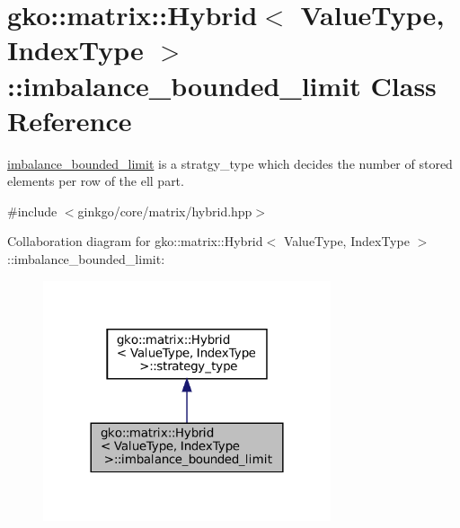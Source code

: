 \hypertarget{classgko_1_1matrix_1_1Hybrid_1_1imbalance__bounded__limit}{}\section{gko\+:\+:matrix\+:\+:Hybrid$<$ Value\+Type, Index\+Type $>$\+:\+:imbalance\+\_\+bounded\+\_\+limit Class Reference}
\label{classgko_1_1matrix_1_1Hybrid_1_1imbalance__bounded__limit}


\hyperlink{classgko_1_1matrix_1_1Hybrid_1_1imbalance__bounded__limit}{imbalance\+\_\+bounded\+\_\+limit} is a stratgy\+\_\+type which decides the number of stored elements per row of the ell part.  




{\ttfamily \#include $<$ginkgo/core/matrix/hybrid.\+hpp$>$}



Collaboration diagram for gko\+:\+:matrix\+:\+:Hybrid$<$ Value\+Type, Index\+Type $>$\+:\+:imbalance\+\_\+bounded\+\_\+limit\+:
\nopagebreak
\begin{figure}[H]
\begin{center}
\leavevmode
\includegraphics[width=240pt]{classgko_1_1matrix_1_1Hybrid_1_1imbalance__bounded__limit__coll__graph}
\end{center}
\end{figure}
